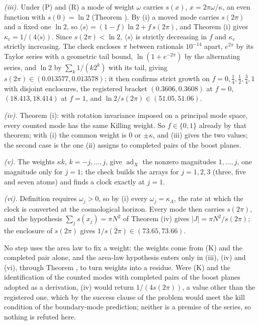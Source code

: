 \emph{(iii).} Under (P) and (R) a mode of weight $\omega$ carries $s(x)$, $x = 2\pi\omega/\kappa$, an even function with $s(0) = \ln 2$ (Theorem ). By (i) a moved mode carries $s(2\pi)$ and a fixed one $\ln 2$, so $\langle s\rangle = (1 - f)\ln 2 + f\,s(2\pi)$, and Theorem (i) gives $\kappa_{c} = 1/(4\langle s\rangle)$. Since $s(2\pi) < \ln 2$, $\langle s\rangle$ is strictly decreasing in $f$ and $\kappa_{c}$ strictly increasing. The check encloses $\pi$ between rationals $10^{-14}$ apart, $e^{2\pi}$ by its Taylor series with a geometric tail bound, $\ln(1 + e^{-2\pi})$ by the alternating series, and $\ln 2$ by $\sum_{k} 1/(k2^{k})$ with its tail, giving $s(2\pi) \in (0.013577, 0.013578)$; it then confirms strict growth on $f = 0, \tfrac14, \tfrac12, \tfrac34, 1$ with disjoint enclosures, the registered bracket $(0.3606, 0.3608)$ at $f = 0$, $(18.413, 18.414)$ at $f = 1$, and $\ln 2/s(2\pi) \in (51.05, 51.06)$.

\emph{(iv).} Theorem (i): with rotation invariance imposed on a principal mode space, every counted mode has the same Killing weight. So $f \in \{0, 1\}$ already by that theorem; with (i) the common weight is $0$ or $\pm\kappa$, and (iii) gives the two values; the second case is the one (ii) assigns to completed pairs of the boost planes.

\emph{(v).} The weights $\kappa k$, $k = -j, \ldots, j$, give $\operatorname{ad}_{X}$ the nonzero magnitudes $1, \ldots, j$, one magnitude only for $j = 1$; the check builds the arrays for $j = 1, 2, 3$ (three, five and seven atoms) and finds a clock exactly at $j = 1$.

\emph{(vi).} Definition  requires $\omega_{j} > 0$, so by (i) every $\omega_{j} = \kappa_{\Lambda}$, the rate at which the clock is converted at the cosmological horizon. Every mode then carries $s(2\pi)$, and the hypothesis $\sum_{j}s(x_{j}) = \pi N^{2}$ of Theorem (iv) gives $|J| = \pi N^{2}/s(2\pi)$; the enclosure of $s(2\pi)$ gives $1/s(2\pi) \in (73.65, 73.66)$.

No step uses the area law to fix a weight: the weights come from (K) and the completed pair alone, and the area-law hypothesis enters only in (iii), (iv) and (vi), through Theorem , to turn weights into a residue. Were (K) and the identification of the counted modes with completed pairs of the boost planes adopted as a derivation, (iv) would return $1/(4s(2\pi))$, a value other than the registered one, which by the success clause of the problem would meet the kill condition of the boundary-mode prediction; neither is a premise of the series, so nothing is refuted here.
